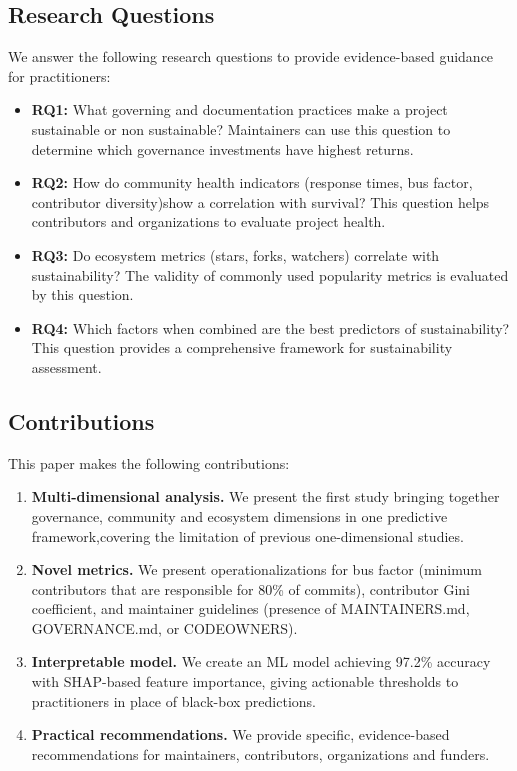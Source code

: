 \documentclass[conference]{IEEEtran}
\begin{document}
\subsection{Research Questions}

We answer the following research questions to provide evidence-based guidance for practitioners:

\begin{itemize}
    \item \textbf{RQ1:} What governing and documentation practices make a project sustainable or non sustainable? Maintainers can use this question to determine which governance investments have highest returns.
    \item \textbf{RQ2:} How do community health indicators (response times, bus factor, contributor diversity)show a correlation with survival? This question helps contributors and organizations to evaluate project health.
    \item \textbf{RQ3:} Do ecosystem metrics (stars, forks, watchers) correlate with sustainability? The validity of commonly used popularity metrics is evaluated by this question.
    \item \textbf{RQ4:} Which factors when combined are the best predictors of sustainability? This question provides a comprehensive framework for sustainability assessment.
\end{itemize}

\subsection{Contributions}

This paper makes the following contributions:
\begin{enumerate}
    \item \textbf{Multi-dimensional analysis.} We present the first study bringing together governance, community and ecosystem dimensions in one predictive framework,covering  the limitation of previous one-dimensional studies.
    \item \textbf{Novel metrics.} We present operationalizations for bus factor (minimum contributors that are responsible for 80\% of commits), contributor Gini coefficient, and maintainer guidelines (presence of MAINTAINERS.md, GOVERNANCE.md, or CODEOWNERS).
    \item \textbf{Interpretable model.} We create an ML model achieving 97.2\% accuracy with SHAP-based feature importance, giving actionable thresholds to practitioners in place of black-box predictions.
    \item \textbf{Practical recommendations.} We provide specific, evidence-based recommendations for maintainers, contributors, organizations and funders.
\end{enumerate}
\end{document}
